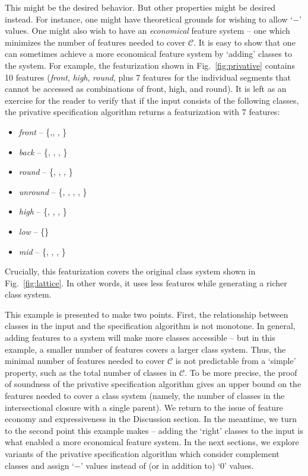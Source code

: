 \documentclass[11pt, oneside]{article}   	%
\begin{document}
This might be the desired behavior. But other properties might be desired instead. For instance, one might have theoretical grounds for wishing to allow `$-$' values. One might also wish to have an \textit{economical} feature system -- one which minimizes the number of features needed to cover $\mathcal C$. It is easy to show that one can sometimes achieve a more economical  feature system by `adding' classes to the system. For example, the featurization shown in Fig.~\ref{fig:privative} contains 10 features (\textit{front}, \textit{high}, \textit{round}, plus 7 features for the individual segments that cannot be accessed as combinations of front, high, and round). It is left as an exercise for the reader to verify that if the input consists of the following classes, the privative specification algorithm returns a featurization with 7 features: \begin{itemize}
    \item \textit{front} -- \{,, , \textipa{\oe}\}
    \item \textit{back} -- \{, , , \}
    \item \textit{round} -- \{, , \textipa{\oe}, \}
    \item \textit{unround} --  \{, , , , \}
    \item \textit{high} --  \{, , , \}
    \item \textit{low} -- \{\}
    \item \textit{mid} --  \{, \textipa{\oe}, , \}
    \end{itemize}
Crucially, this featurization covers the original class system shown in Fig.~\ref{fig:lattice}. In other words, it uses less features while generating a richer class system.

This example is presented to make two points. First, the relationship between classes in the input and the specification algorithm is not monotone. In general, adding features to a system will make more classes accessible -- but in this example, a smaller number of features covers a larger class system. Thus, the minimal number of features needed to cover $\mathcal C$ is not predictable from a `simple' property, such as the total number of classes in $\mathcal C$. To be more precise, the proof of soundness of the privative specification algorithm gives an upper bound on the features needed to cover a class system (namely, the number of classes in the intersectional closure with a single parent). We return to the issue of feature economy and expressiveness in the Discussion section. In the meantime, we turn to the second point this example makes -- adding the `right' classes to the input is what enabled a more economical feature system. In the next sections, we explore variants of the privative specification algorithm which consider complement classes and assign `$-$' values instead of (or in addition to) `$0$' values. 
\end{document}
